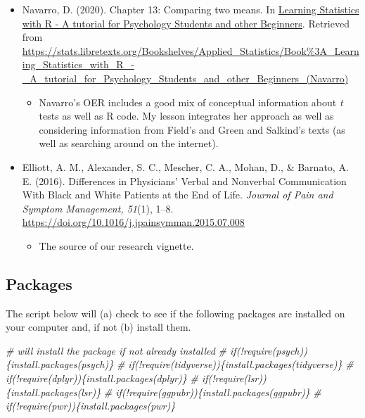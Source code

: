 \documentclass[
  11pt,
]{book}
\newenvironment{Shaded}{\begin{snugshade}}{\end{snugshade}}
\newcommand{\CommentTok}[1]{\textcolor[rgb]{0.56,0.35,0.01}{\textit{#1}}}
\providecommand{\tightlist}{%
  \setlength{\itemsep}{0pt}\setlength{\parskip}{0pt}}
\begin{document}
\begin{itemize}
\tightlist
\item
  Navarro, D. (2020). Chapter 13: Comparing two means. In \href{https://learningstatisticswithr.com/}{Learning Statistics with R - A tutorial for Psychology Students and other Beginners}. Retrieved from \url{https://stats.libretexts.org/Bookshelves/Applied_Statistics/Book\%3A_Learning_Statistics_with_R_-_A_tutorial_for_Psychology_Students_and_other_Beginners_(Navarro)}

  \begin{itemize}
  \tightlist
  \item
    Navarro's OER includes a good mix of conceptual information about \emph{t} tests as well as R code. My lesson integrates her approach as well as considering information from Field's \citeyearpar{field_discovering_2012} and Green and Salkind's \citeyearpar{green_using_2014} texts (as well as searching around on the internet).
  \end{itemize}
\item
  Elliott, A. M., Alexander, S. C., Mescher, C. A., Mohan, D., \& Barnato, A. E. (2016). Differences in Physicians' Verbal and Nonverbal Communication With Black and White Patients at the End of Life. \emph{Journal of Pain and Symptom Management, 51}(1), 1--8. \url{https://doi.org/10.1016/j.jpainsymman.2015.07.008}

  \begin{itemize}
  \tightlist
  \item
    The source of our research vignette.
  \end{itemize}
\end{itemize}

\hypertarget{packages-1}{%
\subsection{Packages}\label{packages-1}}

The script below will (a) check to see if the following packages are installed on your computer and, if not (b) install them.

\begin{Shaded}
\begin{Highlighting}[]
\CommentTok{\# will install the package if not already installed}
\CommentTok{\# if(!require(psych))\{install.packages(\textquotesingle{}psych\textquotesingle{})\}}
\CommentTok{\# if(!require(tidyverse))\{install.packages(\textquotesingle{}tidyverse\textquotesingle{})\}}
\CommentTok{\# if(!require(dplyr))\{install.packages(\textquotesingle{}dplyr\textquotesingle{})\}}
\CommentTok{\# if(!require(lsr))\{install.packages(\textquotesingle{}lsr\textquotesingle{})\}}
\CommentTok{\# if(!require(ggpubr))\{install.packages(\textquotesingle{}ggpubr\textquotesingle{})\}}
\CommentTok{\# if(!require(pwr))\{install.packages(\textquotesingle{}pwr\textquotesingle{})\}}
\end{Highlighting}
\end{Shaded}
\end{document}
